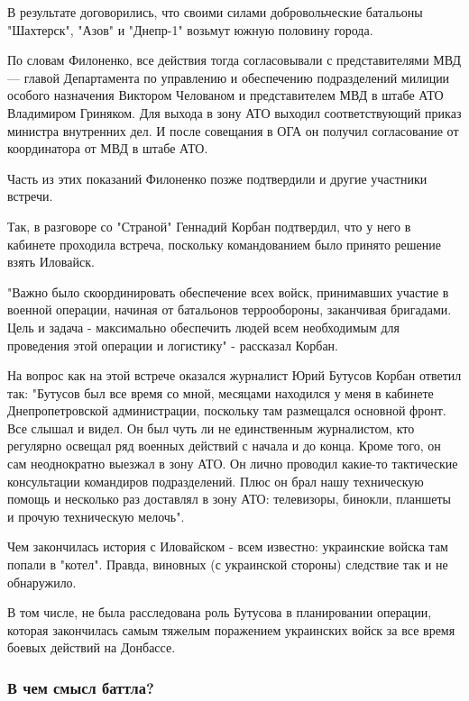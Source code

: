 В результате договорились, что своими силами добровольческие батальоны
"Шахтерск", "Азов" и "Днепр-1" возьмут южную половину города.

По словам Филоненко, все действия тогда согласовывали с представителями
МВД — главой Департамента по управлению и обеспечению подразделений
милиции особого назначения Виктором Челованом и представителем МВД в штабе
АТО Владимиром Гриняком. Для выхода в зону АТО выходил соответствующий
приказ министра внутренних дел. И после совещания в ОГА он получил
согласование от координатора от МВД в штабе АТО.

Часть из этих показаний Филоненко позже подтвердили и другие участники
встречи.

Так, в разговоре со "Страной" Геннадий Корбан подтвердил, что у него в
кабинете проходила встреча, поскольку командованием было принято решение
взять Иловайск.

"Важно было скоординировать обеспечение всех войск, принимавших участие в
военной операции, начиная от батальонов террообороны, заканчивая
бригадами. Цель и задача - максимально обеспечить людей всем необходимым
для проведения этой операции и логистику" - рассказал Корбан.



На вопрос как на этой встрече оказался журналист Юрий Бутусов Корбан
ответил так: "Бутусов был все время со мной, месяцами находился у меня в
кабинете Днепропетровской администрации, поскольку там размещался основной
фронт. Все слышал и видел. Он был чуть ли не единственным журналистом, кто
регулярно освещал ряд военных действий с начала и до конца. Кроме того, он
сам неоднократно выезжал в зону АТО. Он лично проводил какие-то
тактические консультации командиров подразделений. Плюс он брал нашу
техническую помощь и несколько раз доставлял в зону АТО: телевизоры,
бинокли, планшеты и прочую техническую мелочь".

Чем закончилась история с Иловайском - всем известно: украинские войска
там попали в "котел". Правда, виновных (с украинской стороны) следствие
так и не обнаружило.

В том числе, не была расследована роль Бутусова в планировании операции,
которая закончилась самым тяжелым поражением украинских войск за все время
боевых действий на Донбассе.

\subsubsection{В чем смысл баттла?}

